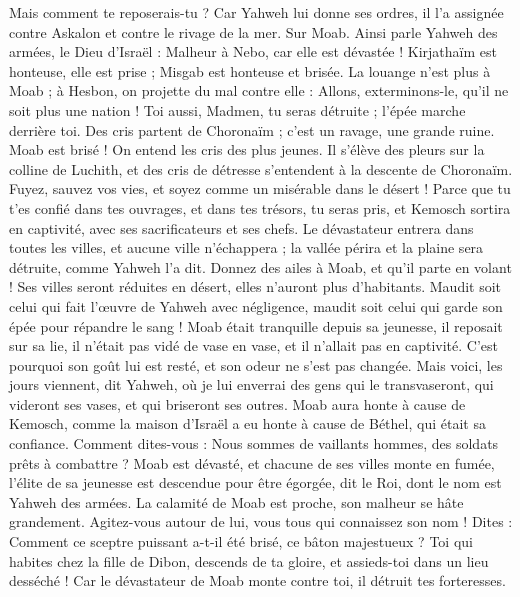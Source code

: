 \begin{multicols}{2}
Mais comment te reposerais-tu ? Car Yahweh lui donne ses ordres, il l'a assignée contre Askalon et contre le rivage de la mer.
\VerseOne{}Sur Moab. Ainsi parle Yahweh des armées, le Dieu d'Israël : Malheur à Nebo, car elle est dévastée ! Kirjathaïm est honteuse, elle est prise ; Misgab est honteuse et brisée.
La louange n'est plus à Moab ; à Hesbon, on projette du mal contre elle : Allons, exterminons-le, qu'il ne soit plus une nation ! Toi aussi, Madmen, tu seras détruite ; l'épée marche derrière toi.
Des cris partent de Choronaïm ; c'est un ravage, une grande ruine.
Moab est brisé ! On entend les cris des plus jeunes.
Il s'élève des pleurs sur la colline de Luchith, et des cris de détresse s'entendent à la descente de Choronaïm.
Fuyez, sauvez vos vies, et soyez comme un misérable dans le désert !
Parce que tu t'es confié dans tes ouvrages, et dans tes trésors, tu seras pris, et Kemosch sortira en captivité, avec ses sacrificateurs et ses chefs.
Le dévastateur entrera dans toutes les villes, et aucune ville n'échappera ; la vallée périra et la plaine sera détruite, comme Yahweh l'a dit.
Donnez des ailes à Moab, et qu'il parte en volant ! Ses villes seront réduites en désert, elles n'auront plus d'habitants.
Maudit soit celui qui fait l'œuvre de Yahweh avec négligence, maudit soit celui qui garde son épée pour répandre le sang !
Moab était tranquille depuis sa jeunesse, il reposait sur sa lie, il n'était pas vidé de vase en vase, et il n'allait pas en captivité. C'est pourquoi son goût lui est resté, et son odeur ne s'est pas changée.
Mais voici, les jours viennent, dit Yahweh, où je lui enverrai des gens qui le transvaseront, qui videront ses vases, et qui briseront ses outres.
Moab aura honte à cause de Kemosch, comme la maison d'Israël a eu honte à cause de Béthel, qui était sa confiance.
Comment dites-vous : Nous sommes de vaillants hommes, des soldats prêts à combattre ?
Moab est dévasté, et chacune de ses villes monte en fumée, l'élite de sa jeunesse est descendue pour être égorgée, dit le Roi, dont le nom est Yahweh des armées.
La calamité de Moab est proche, son malheur se hâte grandement.
Agitez-vous autour de lui, vous tous qui connaissez son nom ! Dites : Comment ce sceptre puissant a-t-il été brisé, ce bâton majestueux ?
Toi qui habites chez la fille de Dibon, descends de ta gloire, et assieds-toi dans un lieu desséché ! Car le dévastateur de Moab monte contre toi, il détruit tes forteresses.

\end{multicols}
